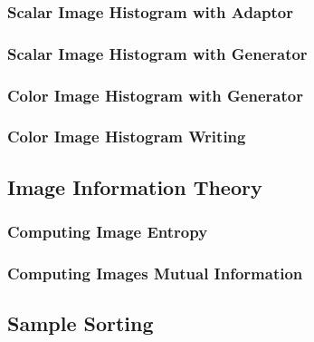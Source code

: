 \subsubsection{Scalar Image Histogram with Adaptor}
\label{sec:ScalarImageHistogramAdaptor}
\ifitkFullVersion 

\fi


\subsubsection{Scalar Image Histogram with Generator}
\label{sec:ScalarImageHistogramGenerator}
\ifitkFullVersion 

\fi


\subsubsection{Color Image Histogram with Generator}
\label{sec:ColorImageHistogramGenerator}
\ifitkFullVersion 

\fi


\subsubsection{Color Image Histogram Writing}
\label{sec:ColorImageHistogramGeneratorWriting}
\ifitkFullVersion 

\fi


\subsection{Image Information Theory}
\label{sec:ComputingImageEntropy}

\subsubsection{Computing Image Entropy}
\label{sec:ComputingImageEntropy}

\ifitkFullVersion 

\fi


\subsubsection{Computing Images Mutual Information}
\label{sec:ComputingImagesMutualInformation}

\ifitkFullVersion 

\fi





\subsection{Sample Sorting}
\label{sec:SampleSorting}

